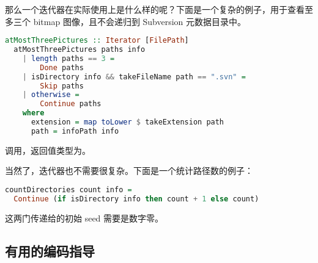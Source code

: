 \documentclass[./main.tex]{subfiles}
\begin{document}
那么一个迭代器在实际使用上是什么样的呢？下面是一个复杂的例子，用于查看至多三个 bitmap 图像，且不会递归到 Subversion 元数据目录中。

\begin{lstlisting}[language=Haskell]
  atMostThreePictures :: Iterator [FilePath]
  atMostThreePictures paths info
    | length paths == 3 =
        Done paths
    | isDirectory info && takeFileName path == ".svn" =
        Skip paths
    | otherwise =
        Continue paths
    where
      extension = map toLower $ takeExtension path
      path = infoPath info
\end{lstlisting}

调用，返回值类型为。

当然了，迭代器也不需要很复杂。下面是一个统计路径数的例子：

\begin{lstlisting}[language=Haskell]
  countDirectories count info =
  Continue (if isDirectory info then count + 1 else count)
\end{lstlisting}

这两门传递给的初始 seed 需要是数字零。

\subsection*{有用的编码指导}

\end{document}
